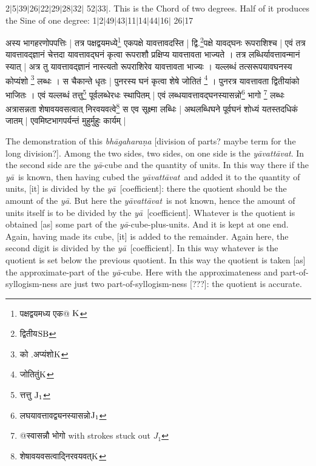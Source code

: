 \documentclass[11pt,a5paper]{book}
\def\yavattavat{\textit{y\=avatt\=avat}}
\def\ya{\textit{y\=a}}
\def\danda{$|$}
\begin{document}
2\danda 5\danda 39\danda 26\danda 22\danda 29\danda 28\danda 32\danda
52\danda 33\danda . This is the Chord of two degrees. Half of it produces the
Sine of one degree: 
1\danda 2\danda 49\danda 43\danda 11\danda 14\danda 44\danda 16\danda
26\danda 17 

\newpage
{\s अस्य भागहरणोपपत्तिः | 
तत्र पक्षद्वयमध्ये\footnote{{\s पक्षद्वयमध्य एक@ }${\rm K}$} एकपक्षे
यावत्तावदस्ति | 
द्वि.\footnote{{\s द्वितीय}${\rm SB}$}पक्षे यावद्घनः रूपराशिश्च | 
एवं तत्र यावत्तावद्ज्ञानं चेत्तदा यावत्तावद्घनं कृत्वा
रूपराशौ प्रक्षिप्य यावत्तावता भाज्यते । तत्र लब्धिर्यावत्तावन्मानं
स्यात् | 
अत्र तु यावत्तावद्ज्ञानं
नास्त्यतो रूपराशिरेव यावत्तावता भाज्यः । 
यल्लब्धं तत्सरूपयावघनस्य कोप्यंशो \footnote{{\s को .अप्यंशो}${\rm K}$} लब्धः । 
स चैकान्ते धृतः | 
पुनरस्य घनं कृत्वा 
शेषे जोतितं \footnote{{\s जोतितुं}${\rm K}$} । पुनरत्र यावत्तावता द्वितीयांको भाजितः । 
एवं यल्लब्धं तत्तु\footnote{{\s त्तत्तु }${\rm J_1}$}
पूर्वलब्धेरधः स्थापितम् | 
एवं लब्धयावत्तावद्घनस्यासन्नो\footnote{{\s लघयावत्तावद्व्यनस्यासन्नो}${\rm J_1}$} भागो 
\footnote{{\s @स्वासन्नौ भोगो } with strokes stuck out $J_1$} %
लब्धः %
अत्रासन्नता शेषावयवसत्वात् निरवयवत्वे\footnote{{\s शेषावयवसत्वाद्निरवयवत्}${\rm K}$} स एव सूक्ष्मा
लब्धिः | 
अथलब्धिघने पूर्वघनं शोध्यं यतस्तदधिकं जातम् | 
एवमिष्टभागपर्यन्तं मुहुर्मुहुः कार्यम् | }
\newpage 

The demonstration of this \textit{bh\=agaharaṇa} [division of parts? maybe term for the long division?]. Among the two sides, two sides, on one side is the \yavattavat. 
In the second side are the \ya-cube
and the quantity of units. In this way there if the \ya\ is known, then having
cubed the \yavattavat\ and added it to the quantity of units, [it] is divided by 
the \ya\ [coefficient]:  there the quotient should be the amount of the \ya. But here the
\yavattavat\ is not known, hence the amount of units itself is to be divided by the \ya\
[coefficient]. 
Whatever is the quotient is obtained [as] some part of the \ya-cube-plus-units.
And it is kept at one end. Again, having made its cube, [it] is added
to the remainder. Again here, the second digit is divided by the \ya\ [coefficient]. In this way
whatever is the quotient is set below the previous quotient. In this way
the quotient is taken [as] the approximate-part of the \ya-cube. Here with the 
approximateness and part-of-syllogism-ness are just two part-of-syllogism-ness [???]:
the quotient is accurate. 
\end{document}
